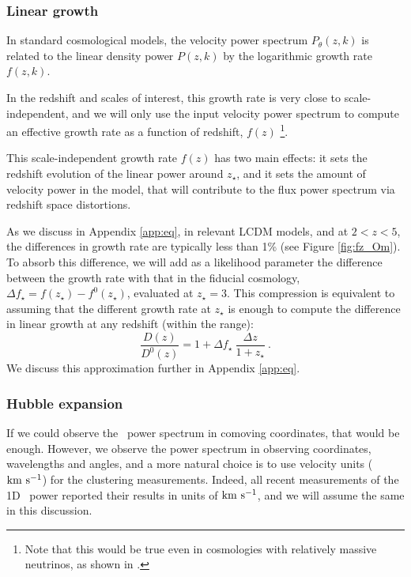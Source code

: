 \subsubsection{Linear growth}

In standard cosmological models, the velocity power spectrum
$P_\theta(z,k)$ is related to the linear density power $P(z,k)$ by the
logarithmic growth rate $f(z,k)$.

In the redshift and scales of interest, this growth rate is very close
to scale-independent, and we will only use the input velocity power spectrum
to compute an effective growth rate as a function of redshift, $f(z)$
\footnote{Note that this would be true even in cosmologies with relatively
massive neutrinos, as shown in \cite{Viel2010,Pedersen2018}.
}.

This scale-independent growth rate $f(z)$ has two main effects: it sets
the redshift evolution of the linear power around $z_\star$, and it sets
the amount of velocity power in the model, that will contribute to the flux
power spectrum via redshift space distortions.

As we discuss in Appendix \ref{app:eq}, in relevant LCDM models, and at
$2 < z < 5$, the differences in growth rate are typically less than 1\%
(see Figure \ref{fig:fz_Om}).
To absorb this difference, we will add as a likelihood parameter the 
difference between the growth rate with that in the fiducial cosmology, 
$\Delta f_\star = f(z_\star) - f^0(z_\star)$, evaluated at $z_\star=3$. 
This compression is equivalent to assuming that the different growth rate
at $z_\star$ is enough to compute the difference in linear growth at any
redshift (within the range):
\begin{equation}\label{eq:growth}
 \frac{D(z)}{D^0(z)} = 1 + \Delta f_\star ~ \frac{\Delta z}{1 + z_\star} ~.
\end{equation} 
We discuss this approximation further in Appendix \ref{app:eq}.

\subsubsection{Hubble expansion}

If we could observe the \lya\ power spectrum in comoving coordinates, that 
would be enough. 
However, we observe the power spectrum in observing coordinates, wavelengths
and angles, and a more natural choice is to use velocity units (${\rm km~s^{-1}}$) for 
the clustering measurements. 
Indeed, all recent measurements of the 1D \lya\ power reported their results
in units of ${\rm km~s^{-1}}$, and we will assume the same in this discussion.

